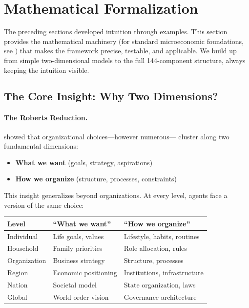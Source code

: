 \section{Mathematical Formalization}
\label{sec:mathformalization}

The preceding sections developed intuition through examples.
This section provides the mathematical machinery (for standard microeconomic foundations, see \citealt{mascolell1995microeconomic}) that makes the framework precise,
testable, and applicable. We build up from simple two-dimensional models
to the full 144-component structure, always keeping the intuition visible.

\subsection{The Core Insight: Why Two Dimensions?}

\paragraph{The Roberts Reduction.}
\citet{roberts2004} showed that organizational choices---however numerous---
cluster along two fundamental dimensions:
\begin{itemize}
  \item \textbf{What we want} (goals, strategy, aspirations)
  \item \textbf{How we organize} (structure, processes, constraints)
\end{itemize}

This insight generalizes beyond organizations.
At every level, agents face a version of the same choice:
\begin{center}
\renewcommand{\arraystretch}{1.3}
\begin{tabular}{lll}
\hline
\textbf{Level} & \textbf{``What we want''} & \textbf{``How we organize''} \\
\hline
Individual & Life goals, values & Lifestyle, habits, routines \\
Household & Family priorities & Role allocation, rules \\
Organization & Business strategy & Structure, processes \\
Region & Economic positioning & Institutions, infrastructure \\
Nation & Societal model & State organization, laws \\
Global & World order vision & Governance architecture \\
\hline
\end{tabular}
\end{center}

